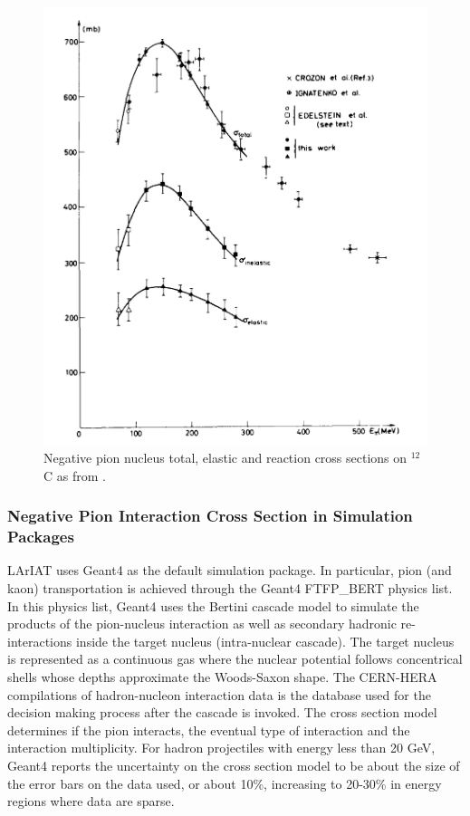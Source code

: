 \begin{figure}[hbpt]
\centering
\includegraphics[scale=0.9]{Chapter-1/Images/PionCarbon.png}
\caption{Negative pion nucleus total, elastic and reaction cross sections on $^{12}$C as from \cite{BINON1970168}.  }
\label{fig:pi2}
\end{figure}

\subsubsection{Negative Pion Interaction Cross Section in Simulation Packages}
LArIAT uses Geant4 as the default simulation package. In particular, pion (and kaon) transportation is achieved through the Geant4 FTFP\_BERT physics list. In this physics list, Geant4 uses the Bertini cascade model  \cite{Wright:2015xia}  to simulate the products of the pion-nucleus interaction as well as secondary hadronic re-interactions inside the target nucleus (intra-nuclear cascade).  The target nucleus is represented as a continuous gas where the nuclear potential follows concentrical shells whose depths approximate the Woods-Saxon shape.  The CERN-HERA compilations \cite{Compilation1,Compilation2} of hadron-nucleon interaction data is the database used for the decision making process after the cascade is invoked. The cross section model determines if the pion interacts, the eventual type of interaction and the interaction multiplicity. For  hadron projectiles with energy less than 20 GeV, Geant4 reports  the uncertainty on the cross section model to be about the size of the error bars on the data used, or about 10\%, increasing to 20-30\% in energy regions where data are sparse. 

